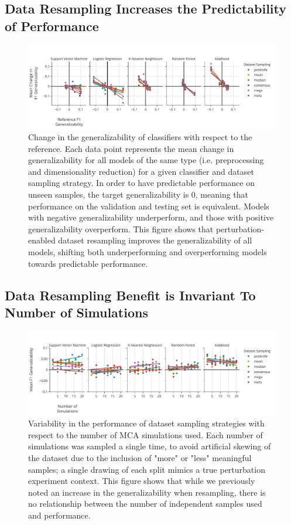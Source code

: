 \documentclass[fleqn,10pt]{SelfArx} %
\begin{document}
\subsection*{Data Resampling Increases the Predictability of Performance}
\begin{figure}[bht!]\centering
\includegraphics[width=\linewidth]{figures/2.pdf}
\caption{Change in the generalizability of classifiers with respect to the reference. Each data point represents the
mean change in generalizability for all models of the same type (i.e. preprocessing and dimensionality reduction) for a
given classifier and dataset sampling strategy. In order to have predictable performance on unseen samples, the target
generalizability is $0$, meaning that performance on the validation and testing set is equivalent. Models with negative
generalizability underperform, and those with positive generalizability overperform. This figure shows that
perturbation-enabled dataset resampling improves the generalizability of all models, shifting both underperforming and
overperforming models towards predictable performance.}
\label{fig:change_in_gen}
\end{figure}


\subsection*{Data Resampling Benefit is Invariant To Number of Simulations}

\begin{figure}[ht]\centering
\includegraphics[width=\linewidth]{figures/3.pdf}
\caption{Variability in the performance of dataset sampling strategies with respect to the number of MCA simulations
used. Each number of simulations was sampled a single time, to avoid artificial skewing of the dataset due to the
inclusion of "more" or "less" meaningful samples; a single drawing of each split mimics a true perturbation experiment
context. This figure shows that while we previously noted an increase in the generalizability when resampling, there is
no relationship between the number of independent samples used and performance.}
\label{fig:nsamples}
\end{figure}
 
\end{document}
